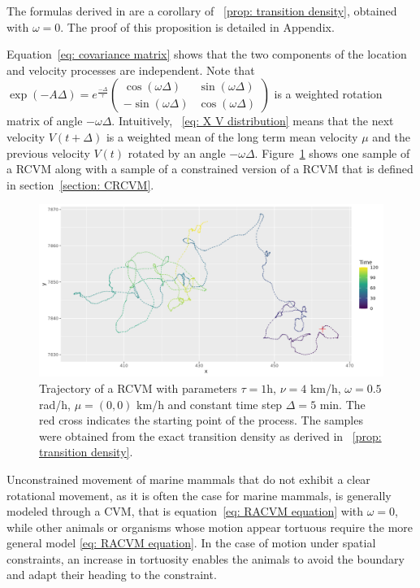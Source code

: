 \documentclass[11pt]{article}
\newcommand {\1}{\mathbb{1}}
\theoremstyle{definition}
\theoremstyle{remark}
\theoremstyle{remark}
\begin{document}
The formulas derived in \cite{johnson_continuoustime_2008} are a corollary of ~\ref{prop: transition density}, obtained with $\omega=0$. The proof of this proposition is detailed in Appendix.

Equation~\ref{eq: covariance matrix} shows that the two components of the location and velocity processes are independent.
Note that $\exp(-A\Delta)=e^{\frac{-\Delta}{\tau}} \begin{pmatrix} \cos(\omega \Delta) & \sin(\omega \Delta) \\ -\sin(\omega \Delta) & \cos(\omega \Delta) \end{pmatrix}$ is a weighted rotation matrix of angle $-\omega \Delta$.
Intuitively, ~\ref{eq: X V distribution} means that the next velocity $V(t+\Delta)$ is a weighted mean of the long term mean velocity $\mu$ and the previous velocity $V(t)$ rotated by an angle $-\omega \Delta$.
 Figure~\ref{fig: sample RACVM} shows one sample of a RCVM along with a sample of a constrained version of a RCVM that is defined in section~\ref{section: CRCVM}.\\



\begin{figure}[H]
	\centering
	\includegraphics[scale=0.5]{images/rcvm/illustrative_sample_standard.png}
	\caption{Trajectory of a RCVM with parameters $\tau=1$h, $\nu=4$ km/h, $\omega=0.5$ rad/h, $\mu=(0,0)$ km/h and constant time step $\Delta=5$ min. The red cross indicates the starting point of the process. The samples were obtained from the exact transition density as derived in ~\ref{prop: transition density}.}
	\label{fig: sample RACVM}
\end{figure}


Unconstrained movement of marine mammals that do not exhibit a clear rotational movement, as it is often the case for marine mammals, is generally modeled through a CVM, that is equation~\ref{eq: RACVM equation} with $\omega=0$, while other animals or organisms whose motion appear tortuous require the more general model \ref{eq: RACVM equation}.
In the case of motion under spatial constraints, an increase in tortuosity enables the animals to avoid the boundary and adapt their heading to the constraint. 
\end{document}
